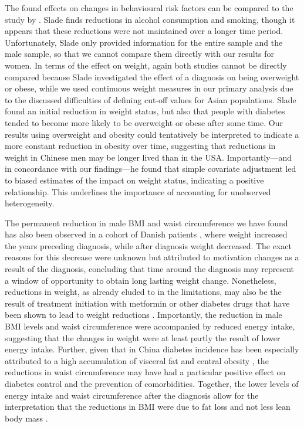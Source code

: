 The found effects on changes in behavioural risk factors can be compared to the study by \textcite{Slade2012}. Slade finds reductions in alcohol consumption and smoking, though it appears that these reductions were not maintained over a longer time period. Unfortunately, Slade only provided information for the entire sample and the male sample, so that we cannot compare them directly with our results for women. In terms of the effect on weight, again both studies cannot be directly compared because Slade investigated the effect of a diagnosis on being overweight or obese, while we used continuous weight measures in our primary analysis due to the discussed difficulties of defining cut-off values for Asian populations. Slade found an initial reduction in weight status, but also that people with diabetes tended to become more likely to be overweight or obese after some time. Our results using overweight and obesity could tentatively be interpreted to indicate a more constant reduction in obesity over time, suggesting that reductions in weight in Chinese men may be longer lived than in the USA. Importantly---and in concordance with our findings---he found that simple covariate adjustment led to biased estimates of the impact on weight status, indicating a positive relationship. This underlines the importance of accounting for unobserved heterogeneity.

The permanent reduction in male \ac{BMI} and waist circumference we have found has also been observed in a cohort of Danish patients \autocite{DeFineOlivarius2015}, where weight increased the years preceding diagnosis, while after diagnosis weight decreased. The exact reasons for this decrease were unknown but attributed to motivation changes as a result of the diagnosis, concluding that time around the diagnosis may represent a window of opportunity to obtain long lasting weight change. Nonetheless, reductions in weight, as already eluded to in the limitations, may also be the result of treatment initiation with metformin or other diabetes drugs that have been shown to lead to weight reductions \autocite{Yang2014}. Importantly, the reduction in male \ac{BMI} levels and waist circumference were accompanied by reduced energy intake, suggesting that the changes in weight were at least partly the result of lower energy intake.  Further, given that in China diabetes incidence has been especially attributed to a high accumulation of visceral fat and central obesity \autocite{Ma2014}, the reductions in waist circumference may have had a particular positive effect on diabetes control and the prevention of comorbidities. Together, the lower levels of energy intake and waist circumference after the diagnosis allow for the interpretation that the reductions in \ac{BMI} were due to fat loss and not less lean body mass \autocite{Klein2007}. 

